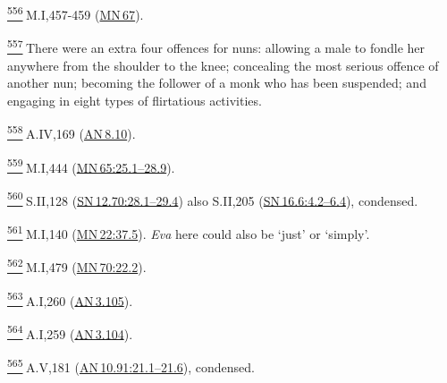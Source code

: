 \label{footprints_split_025.html_fn556}
\hyperref[footprints_split_014.htmlux5cux23fnref556]{\textsuperscript{556}} M.I,457-459
(\href{https://suttacentral.net/mn67/en/sujato}{MN\,67}).

\label{footprints_split_025.html_fn557}
\hyperref[footprints_split_014.htmlux5cux23fnref557]{\textsuperscript{557}} There
were an extra four offences for nuns: allowing a male to fondle her
anywhere from the shoulder to the knee; concealing the most serious
offence of another nun; becoming the follower of a monk who has been
suspended; and engaging in eight types of flirtatious activities.

\label{footprints_split_025.html_fn558}
\hyperref[footprints_split_014.htmlux5cux23fnref558]{\textsuperscript{558}} A.IV,169
(\href{https://suttacentral.net/an8.10/en/sujato}{AN\,8.10}).

\label{footprints_split_025.html_fn559}
\hyperref[footprints_split_014.htmlux5cux23fnref559]{\textsuperscript{559}} M.I,444
(\href{https://suttacentral.net/mn65/en/sujato\#25.1}{MN\,65:25.1--28.9}).

\label{footprints_split_025.html_fn560}
\hyperref[footprints_split_014.htmlux5cux23fnref560]{\textsuperscript{560}} S.II,128
(\href{https://suttacentral.net/sn12.70/en/sujato\#28.1}{SN\,12.70:28.1--29.4})
also S.II,205
(\href{https://suttacentral.net/sn16.6/en/sujato\#4.2}{SN\,16.6:4.2--6.4}),
condensed.

\label{footprints_split_025.html_fn561}
\hyperref[footprints_split_015.htmlux5cux23fnref561]{\textsuperscript{561}} M.I,140
(\href{https://suttacentral.net/mn22/en/sujato\#37.5}{MN\,22:37.5}).
\emph{Eva} here could also be `just' or `simply'.

\label{footprints_split_025.html_fn562}
\hyperref[footprints_split_015.htmlux5cux23fnref562]{\textsuperscript{562}} M.I,479
(\href{https://suttacentral.net/mn70/en/sujato\#22.2}{MN\,70:22.2}).

\label{footprints_split_025.html_fn563}
\hyperref[footprints_split_015.htmlux5cux23fnref563]{\textsuperscript{563}} A.I,260
(\href{https://suttacentral.net/an3.105/en/sujato}{AN\,3.105}).

\label{footprints_split_025.html_fn564}
\hyperref[footprints_split_015.htmlux5cux23fnref564]{\textsuperscript{564}} A.I,259
(\href{https://suttacentral.net/an3.104/en/sujato}{AN\,3.104}).

\label{footprints_split_025.html_fn565}
\hyperref[footprints_split_015.htmlux5cux23fnref565]{\textsuperscript{565}} A.V,181
(\href{https://suttacentral.net/an10.91/en/sujato\#21.1}{AN\,10.91:21.1--21.6}),
condensed.

